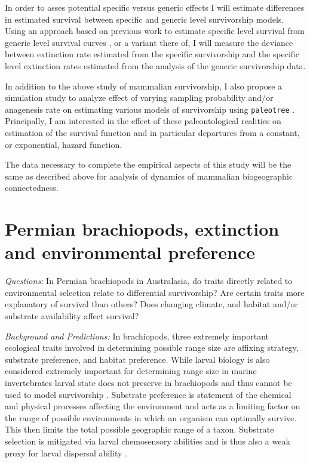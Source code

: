 \documentclass[12pt,letterpaper]{article}
\begin{document}
In order to asses potential specific versus generic effects I will estimate differences in estimated survival between specific and generic level survivorship models. Using an approach based on previous work to estimate specific level survival from generic level survival curves \citep{Foote1988}, or a variant there of, I will measure the deviance between extinction rate estimated from the specific survivorship and the specific level extinction rates estimated from the analysis of the generic survivorship data. 

In addition to the above study of mammalian survivorship, I also propose a simulation study to analyze effect of varying sampling probability and/or anagenesis rate on estimating various models of survivorship using \texttt{paleotree} \citep{Bapst2012a}. Principally, I am interested in the effect of these paleontological realities on estimation of the survival function and in particular departures from a constant, or exponential, hazard function. 

The data necessary to complete the empirical aspects of this study will be the same as described above for analysis of dynamics of mammalian biogeographic connectedness.


\section{Permian brachiopods, extinction and environmental preference}

\textit{Questions:} In Permian brachiopods in Australasia, do traits directly related to environmental selection relate to differential survivorship? Are certain traits more explanatory of survival than others? Does changing climate, and habitat and/or substrate availability affect survival?

\textit{Background and Predictions:}
In brachiopods, three extremely important ecological traits involved in determining possible range size are affixing strategy, substrate preference, and habitat preference. While larval biology is also considered extremely important for determining range size in marine invertebrates \citep{Jablonski2006a,Jablonski1983} larval state does not preserve in brachiopods and thus cannot be used to model survivorship \citep{Jablonski1983}. Substrate preference is statement of the chemical and physical processes affecting the environment and acts as a limiting factor on the range of possible environments in which an organism can optimally survive. This then limits the total possible geographic range of a taxon. Substrate selection is mitigated via larval chemosensory abilities and is thus also a weak proxy for larval dispersal ability \citep{Jablonski2006a,Jablonski1983}. 
\end{document}
